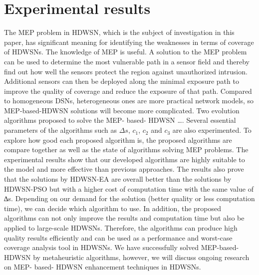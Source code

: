 \documentclass[final]{elsarticle}
\begin{document}
\section{Experimental results}
The MEP problem in HDWSN, which is the subject of investigation in this paper, has significant meaning for identifying the weaknesses in terms of coverage of HDWSNs. The knowledge of MEP is useful. A solution to the MEP problem can be used to determine the most vulnerable path in a sensor field and thereby find out how well the sensors protect the region against unauthorized intrusion. Additional sensors can then be deployed along the minimal exposure path to improve the quality of coverage and reduce the exposure of that path. Compared to homogeneous DSNs, heterogeneous ones are more practical network models, so MEP-based-HDWSN solutions will become more complicated. Two evolution algorithms proposed to solve the MEP- based- HDWSN …. Several essential parameters of the algorithms such as $\Delta s$, $ c_1 $, $ c_2 $ and $ c_3 $ are also experimented. To explore how good each proposed algorithm is, the proposed algorithms are compare together as well as the state of algorithms solving MEP problems. The experimental results show that our developed algorithms are highly suitable to the model and more effective than previous approaches. The results also prove that the solutions by HDWSN-EA are overall better than the solutions by HDWSN-PSO but with a higher cost of computation time with the same value of ∆s. Depending on our demand for the solution (better quality or less computation time), we can decide which algorithm to use. In addition, the proposed algorithms can not only improve the results and computation time but also be applied to large-scale HDWSNs. Therefore, the algorithms can produce high quality results efficiently and can be used as a performance and worst-case coverage analysis tool in HDWSNs. We have successfully solved MEP-based-HDWSN by metaheuristic algorithms, however, we will discuss ongoing research on MEP- based- HDWSN enhancement techniques in HDWSNs.
\end{document}
